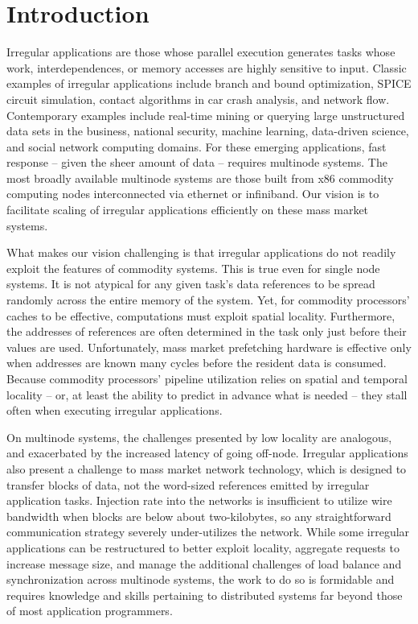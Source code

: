 \section{Introduction} \label{sec:intro}

Irregular applications are those whose parallel execution generates tasks whose work, interdependences, or memory accesses are highly sensitive to input.  Classic examples of irregular applications include branch and bound optimization, SPICE circuit simulation, contact algorithms in car crash analysis, and network flow.  Contemporary examples include real-time mining or querying large unstructured data sets in the business, national security, machine learning, data-driven science, and social network computing domains.  For these emerging applications, fast response -- given the sheer amount of data -- requires multinode systems.  The most broadly available multinode systems are those built from x86 commodity computing nodes interconnected via ethernet or infiniband.  Our vision is to facilitate scaling of irregular applications efficiently on these mass market systems.

What makes our vision challenging is that irregular applications do not readily exploit the features of commodity systems.  This is true even for single node systems.  It is not atypical for any given task's data references to be spread randomly across the entire memory of the system.  Yet, for commodity processors' caches to be effective, computations must exploit spatial locality.  Furthermore, the addresses of references are often determined in the task only just before their values are used.  Unfortunately, mass market prefetching hardware is effective only when addresses are known many cycles before the resident data is consumed.  Because commodity processors' pipeline utilization relies on spatial and temporal locality -- or, at least the ability to predict in advance what is needed -- they stall often when executing irregular applications.

On multinode systems, the challenges presented by low locality are analogous, and exacerbated by the increased latency of going off-node.  Irregular applications also present a challenge to mass market network technology, which is designed to transfer blocks of data, not the word-sized references emitted by irregular application tasks.  Injection rate into the networks is insufficient to utilize wire bandwidth when blocks are below about two-kilobytes, so any straightforward communication strategy severely under-utilizes the network.  While some irregular applications can be restructured to better exploit locality, aggregate requests to increase message size, and manage the additional challenges of load balance and synchronization across multinode systems, the work to do so is formidable and requires knowledge and skills pertaining to distributed systems far beyond those of most application programmers.


